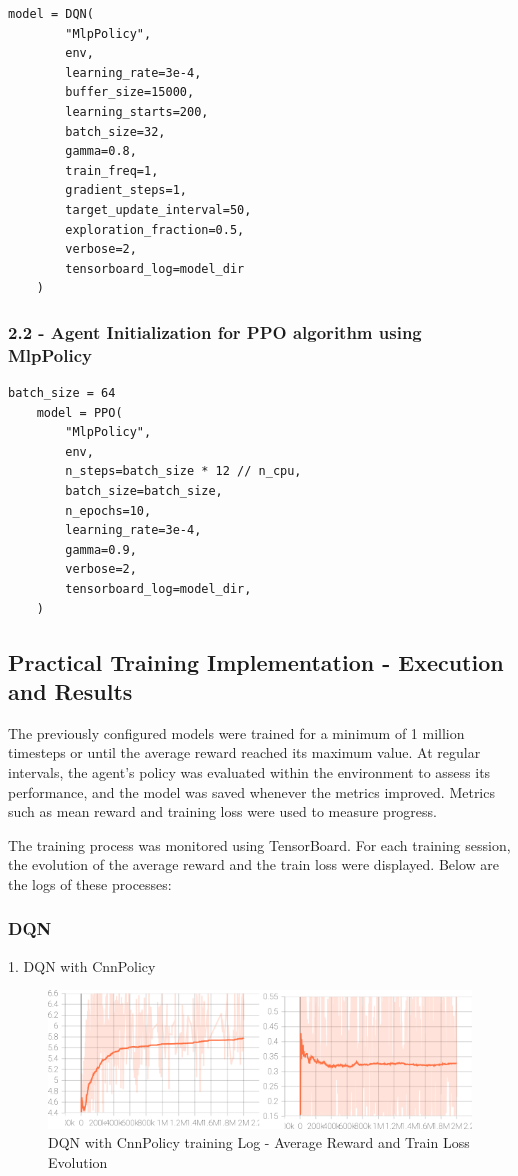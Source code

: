  \begin{lstlisting}[style=python]
    model = DQN(
        "MlpPolicy",
        env,
        learning_rate=3e-4,
        buffer_size=15000,
        learning_starts=200,
        batch_size=32,
        gamma=0.8,
        train_freq=1,
        gradient_steps=1,
        target_update_interval=50,
        exploration_fraction=0.5,
        verbose=2,
        tensorboard_log=model_dir
    )
\end{lstlisting}

\subsubsection{2.2 - Agent Initialization for PPO algorithm using MlpPolicy}

\begin{lstlisting}[style=python]
    batch_size = 64
    model = PPO(
        "MlpPolicy",
        env,
        n_steps=batch_size * 12 // n_cpu,
        batch_size=batch_size,
        n_epochs=10,
        learning_rate=3e-4,
        gamma=0.9,
        verbose=2,
        tensorboard_log=model_dir,
    )
\end{lstlisting}

\subsection{Practical Training Implementation - Execution and Results}

The previously configured models were trained for a minimum of 1 million timesteps or until the average reward reached its maximum value. 
At regular intervals, the agent's policy was evaluated within the environment to assess its performance,
and the model was saved whenever the metrics improved. 
Metrics such as mean reward and training loss were used to measure progress.

The training process was monitored using TensorBoard. 
For each training session, the evolution of the average reward and the train loss were displayed. 
Below are the logs of these processes:


\subsubsection{DQN}

1. DQN with CnnPolicy

\begin{figure}[H]
    \centering
    \includegraphics[height=0.20\textheight]{images/dqn_cnn.png} 
    \caption{DQN with CnnPolicy training Log - Average Reward and Train Loss Evolution}
\end{figure}



